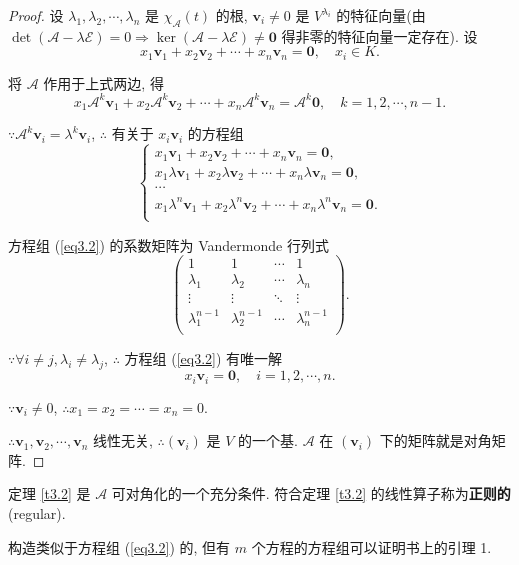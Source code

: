 \documentclass[color=black,device=normal,lang=cn,mode=geye]{elegantnote}
\begin{document}
\begin{proof}
    设 $\lambda_1,\lambda_2,\cdots,\lambda_n$ 是 $\chi_{\mathcal{A}}(t)$ 的根, $\boldsymbol{v}_i\neq0$ 是 $V^{\lambda_i}$ 的特征向量(由 $\det(\mathcal{A}-\lambda\mathcal{E})=0\Rightarrow\ker(\mathcal{A}-\lambda\mathcal{E})\neq\boldsymbol{0}$ 得非零的特征向量一定存在). 设
    \[x_1\boldsymbol{v}_1+x_2\boldsymbol{v}_2+\cdots+x_n\boldsymbol{v}_n=\boldsymbol{0},\quad x_i\in K.\]
    
    将 $\mathcal{A}$ 作用于上式两边, 得
    \[x_1\mathcal{A}^k\boldsymbol{v}_1+x_2\mathcal{A}^k\boldsymbol{v}_2+\cdots+x_n\mathcal{A}^k\boldsymbol{v}_n=\mathcal{A}^k\boldsymbol{0},\quad k=1,2,\cdots,n-1.\]

    $\because\mathcal{A}^k\boldsymbol{v}_i=\lambda^k\boldsymbol{v}_i$, $\therefore$ 有关于 $x_i\boldsymbol{v}_i$ 的方程组
    \begin{equation}\label{eq3.2}
        \begin{cases}
            x_1\boldsymbol{v}_1+x_2\boldsymbol{v}_2+\cdots+x_n\boldsymbol{v}_n=\boldsymbol{0}, \\
            x_1\lambda\boldsymbol{v}_1+x_2\lambda\boldsymbol{v}_2+\cdots+x_n\lambda\boldsymbol{v}_n=\boldsymbol{0}, \\
            \cdots \\
            x_1\lambda^n\boldsymbol{v}_1+x_2\lambda^n\boldsymbol{v}_2+\cdots+x_n\lambda^n\boldsymbol{v}_n=\boldsymbol{0}. \\
        \end{cases}
    \end{equation}
    
    方程组 (\ref{eq3.2}) 的系数矩阵为 Vandermonde 行列式
    \[\begin{pmatrix}
        1 & 1 & \cdots & 1 \\
        \lambda_1 & \lambda_2 & \cdots & \lambda_n \\
        \vdots & \vdots & \ddots & \vdots \\
        \lambda^{n-1}_1 & \lambda^{n-1}_2 & \cdots & \lambda^{n-1}_n \\
    \end{pmatrix}.\]

    $\because\forall i\neq j,\lambda_i\neq\lambda_j$, $\therefore$ 方程组 (\ref{eq3.2}) 有唯一解
    \[x_i\boldsymbol{v}_i=\boldsymbol{0},\quad i=1,2,\cdots,n.\]

    $\because\boldsymbol{v}_i\neq0$, $\therefore x_1=x_2=\cdots=x_n=0$.

    $\therefore\boldsymbol{v}_1,\boldsymbol{v}_2,\cdots,\boldsymbol{v}_n$ 线性无关, $\therefore(\boldsymbol{v}_i)$ 是 $V$ 的一个基. $\mathcal{A}$ 在 $(\boldsymbol{v}_i)$ 下的矩阵就是对角矩阵.
\end{proof}
定理 \ref{t3.2} 是 $\mathcal{A}$ 可对角化的一个充分条件. 符合定理 \ref{t3.2} 的线性算子称为\textbf{正则的}(regular).
\begin{note}
    构造类似于方程组 (\ref{eq3.2}) 的, 但有 $m$ 个方程的方程组可以证明书上的引理 1.
\end{note}
\end{document}
